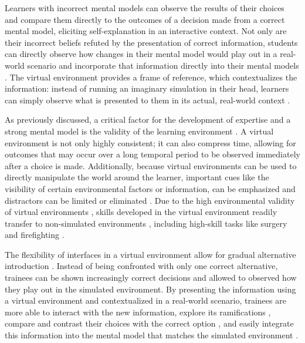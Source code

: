 Learners with incorrect mental models can observe the results of their choices and compare them directly to the outcomes of a decision made from a correct mental model, eliciting self-explanation in an interactive context. Not only are their incorrect beliefs refuted by the presentation of correct information, students can directly observe how changes in their mental model would play out in a real-world scenario and incorporate that information directly into their mental models \citep{Salzman1999}. The virtual environment provides a frame of reference, which contextualizes the information: instead of running an imaginary simulation in their head, learners can simply observe what is presented to them in its actual, real-world context \citep{Ericsson1993}.

As previously discussed, a critical factor for the development of expertise and a strong mental model is the validity of the learning environment \citep{Klein2006, Kahneman2009}. A virtual environment is not only highly consistent; it can also compress time, allowing for outcomes that may occur over a long temporal period to be observed immediately after a choice is made. Additionally, because virtual environments can be used to directly manipulate the world around the learner, important cues like the visibility of certain environmental factors or information, can be emphasized and distractors can be limited or eliminated \citep{Salzman1999}. Due to the high environmental validity of virtual environments \citep{Loomis1999}, skills developed in the virtual environment readily transfer to non-simulated environments \citep{Cromby1996, Watanuki2007}, including high-skill tasks like surgery \citep{Seymour2002} and firefighting \citep{Bliss1997}.

The flexibility of interfaces in a virtual environment allow for gradual alternative introduction \citep{Ericsson1993}. Instead of being confronted with only one correct alternative, trainees can be shown increasingly correct decisions and allowed to observed how they play out in the simulated environment. By presenting the information using a virtual environment and contextualized in a real-world scenario, trainees are more able to interact with the new information, explore its ramifications \citep{Ericsson1993, Patterson2010}, compare and contrast their choices with the correct option \citep{Fowlkes2009}, and easily integrate this information into the mental model that matches the simulated environment \citep{Salzman1999}.
